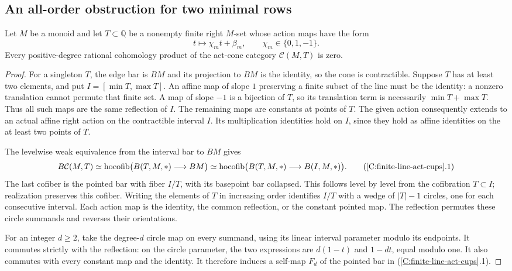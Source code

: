 \subsection{An all-order obstruction for two minimal rows}

\begin{lemma}\label{C:finite-line-act-cups}
Let $M$ be a monoid and let $T\subset\mathbb Q$ be a nonempty finite
right $M$-set whose action maps have the form
\[
 t\longmapsto\chi_m t+\beta_m,
 \qquad \chi_m\in\{0,1,-1\}.
\]
Every positive-degree rational cohomology product of the act-cone
category $\mathcal C(M,T)$ is zero.
\end{lemma}
\begin{proof}
For a singleton $T$, the edge bar is $BM$ and its projection to
$BM$ is the identity, so the cone is contractible.  Suppose $T$
has at least two elements, and put $I=[\min T,\max T]$.
An affine map of slope $1$ preserving a finite subset of the line
must be the identity: a nonzero translation cannot permute that
finite set.  A map of slope $-1$ is a bijection of $T$, so its
translation term is necessarily $\min T+\max T$.  Thus all such
maps are the same reflection of $I$.  The remaining maps are
constants at points of $T$.  The given action consequently extends
to an actual affine right action on the contractible interval $I$.
Its multiplication identities hold on $I$, since they hold as
affine identities on the at least two points of $T$.

The levelwise weak equivalence from the interval bar to $BM$ gives
\[
 B\mathcal C(M,T)
 \simeq\operatorname{hocofib}\bigl(B(T,M,*)\longrightarrow BM\bigr)
 \simeq\operatorname{hocofib}\bigl(B(T,M,*)
                                  \longrightarrow B(I,M,*)\bigr).
                                                               \tag{\ref{C:finite-line-act-cups}.1}
\]
The last cofiber is the pointed bar with fiber $I/T$, with its
basepoint bar collapsed.  This follows level by level from the
cofibration $T\subset I$; realization preserves this cofiber.
Writing the elements of $T$ in increasing order identifies $I/T$
with a wedge of $|T|-1$ circles, one for each consecutive interval.
Each action map is the identity, the common reflection, or the
constant pointed map.  The reflection permutes these circle
summands and reverses their orientations.

For an integer $d\geq2$, take the degree-$d$ circle map on every
summand, using its linear interval parameter modulo its endpoints.
It commutes strictly with the reflection: on the circle parameter,
the two expressions are $d(1-t)$ and $1-dt$, equal modulo one.
It also commutes with every constant map and the identity.
It therefore induces a self-map $F_d$ of the pointed bar in
(\ref{C:finite-line-act-cups}.1).


\end{proof}
